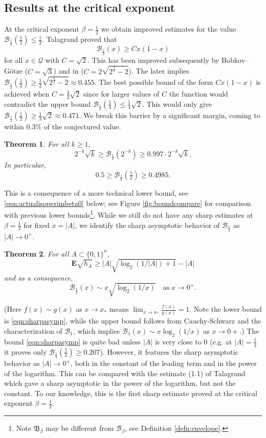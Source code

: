 \documentclass[12pt]{amsart}
\theoremstyle{plain}
\newtheorem{thm}{Theorem}[section]
\theoremstyle{definition}
\theoremstyle{remark}
\numberwithin{equation}{section}
\begin{document}
\subsection{Results at the critical exponent}
At the critical exponent $\beta=\frac12$ we obtain 
improved estimates for the value $\mathcal{B}_\frac12(\frac12)\le \frac12$.
Talagrand \cite{Tal93} proved that 
\[ \mathcal{B}_{\frac12}(x) \ge C x(1-x) \]
for all $x\in\mathcal{Q}$ with $C=\sqrt{2}$.
This has been improved subsequently by Bobkov--G\"otze \cite{BG99} ($C=\sqrt{3}$) and in \cite[Cor. 1.7]{BIM23} ($C=2\sqrt{2^{\frac32}-2}$). 
The later implies $\mathcal{B}_{\frac12}(\frac12)\ge \frac12 \sqrt{2^{\frac32}-2}\approx 0.455$.
The best possible bound of the form $Cx(1-x)$ is achieved when $C=\frac43 \sqrt{2}$ since for larger values of $C$ the function would contradict the upper bound $\mathcal{B}_{\frac12}(\frac14)\le \frac14 \sqrt{2}$. This would only give $\mathcal{B}_{\frac12}(\frac12)\ge \frac13 \sqrt{2}\approx 0.471$. We break this barrier by a significant margin, coming to within $0.3\%$ of the conjectured value.
\begin{thm}\label{thm:onehalf}
For all $k\ge 1$,
\[ 2^{-k} \sqrt{k}\ge \mathcal{B}_{\frac12}(2^{-k})\ge 0.997\cdot 2^{-k} \sqrt{k}. \]
In particular,
\[ 0.5\ge \mathcal{B}_{\frac12}(\tfrac12)\ge 0.4985. \]
\end{thm}
This is a consequence of a more technical lower bound, see \eqref{eqn:actualisoperimbeta0} below; see Figure \ref{fig:boundcompare} for comparison with previous lower bounds\footnote{Note $\mathfrak{B}_{\beta}$ may be different from $\mathcal{B}_{\beta}$, see Definition \ref{defn:envelope}.}.
While we still do not have any sharp estimates at $\beta=\frac12$ for fixed $x=|A|$, we identify the sharp asymptotic behavior of $\mathcal{B}_{\frac12}$ as $|A|\to 0^+$.

\begin{thm}\label{thm:asymp}
For all $A\subset \{0,1\}^n$, 
\begin{equation}\label{eqn:sharpasymp}
\mathbf{E} \sqrt{h_A} \ge |A| \sqrt{\log_2(1/|A|)+1} - |A|
\end{equation}
and as a consequence,
\[ \mathcal{B}_{\frac12}(x) \sim x\sqrt{\log_2(1/x)} \quad\text{as}\;x\to 0^+.\]
\end{thm}
(Here $f(x)\sim g(x)$ as $x\to x_*$ means $\lim_{x\to x_*} \frac{f(x)}{g(x)}=1$. Note the lower bound is \eqref{eqn:sharpasymp}, while the upper bound follows from Cauchy-Schwarz and the characterization of $\mathcal{B}_1$, which implies $\mathcal{B}_1(x)\sim x \log_2(1/x)$ as $x\to 0+$.)
The bound \eqref{eqn:sharpasymp} is quite bad unless $|A|$ is very close to $0$ (e.g. at $|A|=\frac12$ it proves only $\mathcal{B}_{\frac12}(\frac12)\ge 0.207$). 
However, it features the sharp asymptotic behavior as $|A|\to 0^+$, both in the constant of the leading term and in the power of the logarithm.
This can be compared with the estimate (1.1) of Talagrand \cite{Tal93} which gave a sharp asymptotic in the power of the logarithm, but not the constant. To our knowledge, this is the first sharp estimate proved at the critical exponent $\beta=\frac12$.
\end{document}
